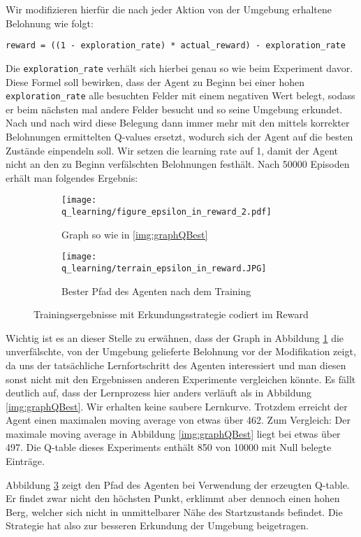 Wir modifizieren hierfür die nach jeder Aktion von der Umgebung erhaltene Belohnung wie folgt:
\begin{verbatim}
reward = ((1 - exploration_rate) * actual_reward) - exploration_rate
\end{verbatim}
Die \texttt{exploration_rate} verhält sich hierbei genau so wie beim Experiment davor. Diese Formel soll bewirken, dass der Agent zu Beginn bei einer hohen \texttt{exploration_rate} alle besuchten Felder mit einem negativen Wert belegt, sodass er beim nächsten mal andere Felder besucht und so seine Umgebung erkundet. Nach und nach wird diese Belegung dann immer mehr mit den mittels korrekter Belohnungen ermittelten Q-values ersetzt, wodurch sich der Agent auf die besten Zustände einpendeln soll. Wir setzen die learning rate auf 1, damit der Agent nicht an den zu Beginn verfälschten Belohnungen festhält. Nach 50000 Episoden erhält man folgendes Ergebnis:
\begin{figure}[H]
    \centering
    \begin{subfigure}[b]{0.49\textwidth}
        \texttt{[image: q\_learning/figure\_epsilon\_in\_reward\_2.pdf]}
        \caption{Graph so wie in \ref{img:graphQBest}}
        \label{img:graphQEpsInRew}
    \end{subfigure}
    \begin{subfigure}[b]{0.49\textwidth}
        \texttt{[image: q\_learning/terrain\_epsilon\_in\_reward.JPG]}
        \caption{Bester Pfad des Agenten nach dem Training}
        \label{img:pathQEpsInRew}
    \end{subfigure}
    \caption{Trainingsergebnisse mit Erkundungsstrategie codiert im Reward}
\end{figure}
Wichtig ist es an dieser Stelle zu erwähnen, dass der Graph in Abbildung \ref{img:graphQEpsInRew} die unverfälschte, von der Umgebung gelieferte Belohnung vor der Modifikation zeigt, da uns der tatsächliche Lernfortschritt des Agenten interessiert und man diesen sonst nicht mit den Ergebnissen anderen Experimente vergleichen könnte. Es fällt deutlich auf, dass der Lernprozess hier anders verläuft als in Abbildung \ref{img:graphQBest}. Wir erhalten keine saubere Lernkurve. Trotzdem erreicht der Agent einen maximalen moving average von etwas über 462. Zum Vergleich: Der maximale moving average in Abbildung \ref{img:graphQBest} liegt bei etwas über 497. Die Q-table dieses Experiments enthält 850 von 10000 mit Null belegte Einträge.

Abbildung \ref{img:pathQEpsInRew} zeigt den Pfad des Agenten bei Verwendung der erzeugten Q-table. Er findet zwar nicht den höchsten Punkt, erklimmt aber dennoch einen hohen Berg, welcher sich nicht in unmittelbarer Nähe des Startzustands befindet. Die Strategie hat also zur besseren Erkundung der Umgebung beigetragen.

